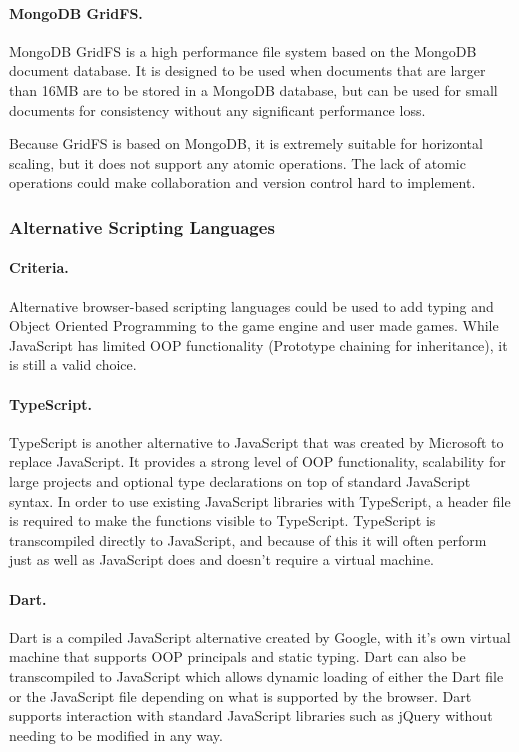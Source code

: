 \documentclass[a4paper, 12pt]{article}
\begin{document}
\paragraph{MongoDB GridFS.}
MongoDB GridFS is a high performance file system based on the MongoDB document database. It is designed to be used when documents that are larger than 16MB are to be stored in a MongoDB database, but can be used for small documents for consistency without any significant performance loss.\cite{gridfs}

Because GridFS is based on MongoDB, it is extremely suitable for horizontal scaling, but it does not support any atomic operations.\cite{gridfsatomic} The lack of atomic operations could make collaboration and version control hard to implement.

\subsubsection{Alternative Scripting Languages}
\paragraph{Criteria.}
Alternative browser-based scripting languages could be used to add typing and Object Oriented Programming to the game engine and user made games. While JavaScript has limited OOP functionality (Prototype chaining for inheritance), it is still a valid choice.

\paragraph{TypeScript.}
TypeScript is another alternative to JavaScript that was created by Microsoft to replace JavaScript. It provides a strong level of OOP functionality, scalability for large projects and optional type declarations on top of standard JavaScript syntax.\cite{typescript} In order to use existing JavaScript libraries with TypeScript, a header file is required to make the functions visible to TypeScript. TypeScript is transcompiled directly to JavaScript, and because of this it will often perform just as well as JavaScript does and doesn't require a virtual machine.

\paragraph{Dart.}
Dart is a compiled JavaScript alternative created by Google, with it's own virtual machine that supports OOP principals and static typing. Dart can also be transcompiled to JavaScript which allows dynamic loading of either the Dart file or the JavaScript file depending on what is supported by the browser.\cite{dart} Dart supports interaction with standard JavaScript libraries such as jQuery without needing to be modified in any way.
\end{document}
